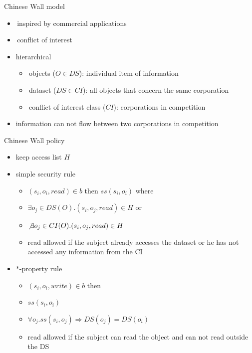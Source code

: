 \documentclass{beamer}
\begin{document}
\begin{frame}{Chinese Wall model}
  \begin{itemize}
    \item inspired by commercial applications
    \item conflict of interest
    \item hierarchical
      \begin{itemize}
      \item objects ($O \in DS$): individual item of information
      \item dataset ($DS \in CI$): all objects that concern the same corporation
      \item conflict of interest class ($CI$): corporations in competition
      \end{itemize}
    \item information can not flow between two corporations in competition
  \end{itemize}
\end{frame}

\begin{frame}{Chinese Wall policy}
  \begin{itemize}
    \item keep access list $H$
    \item simple security rule
      \begin{itemize}
        \item $(s_i, o_i, read) \in b$ then $ss(s_i,o_i)$ where
        \item $\exists o_j \in DS(O). (s_i, o_j, read) \in H$ or
        \item $\not \exists o_j \in CI(O). (s_i, o_j, read) \in H$
        \item read allowed if the subject already accesses the dataset
          or he has not accessed any information from the CI
      \end{itemize}
    \item $*$-property rule
      \begin{itemize}
        \item $(s_i, o_i, write) \in b$ then
        \item $ss(s_i,o_i)$
        \item $\forall o_j.ss(s_i,o_j) \Rightarrow DS(o_j) = DS(o_i)$
        \item read allowed if the subject can read the object and can
          not read outside the DS
      \end{itemize}
  \end{itemize}
\end{frame}
\end{document}
